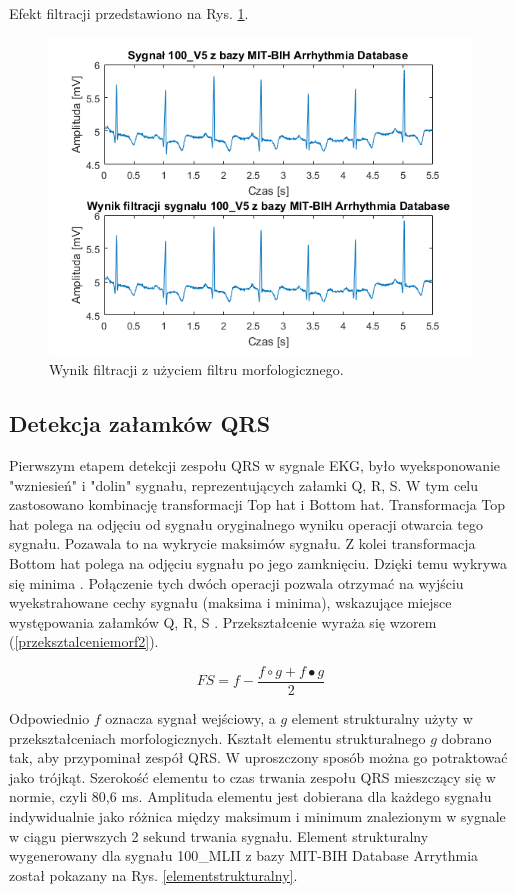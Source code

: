 \documentclass[10pt,a4paper]{article}
\begin{document}
Efekt filtracji przedstawiono na Rys. \ref{filtracja}.


\begin{figure}[h]
	\centerline{\includegraphics[scale=0.85]{filtracja}}
	\caption{ Wynik filtracji z użyciem filtru morfologicznego.}
	\label{filtracja}
\end{figure}
\FloatBarrier


\subsection{Detekcja załamków QRS}

Pierwszym etapem detekcji zespołu QRS w sygnale EKG, było wyeksponowanie "wzniesień" i "dolin" sygnału, reprezentujących załamki Q, R, S. W tym celu zastosowano kombinację transformacji Top hat i Bottom hat. Transformacja Top hat polega na odjęciu od sygnału oryginalnego wyniku operacji otwarcia tego sygnału. Pozawala to na wykrycie maksimów sygnału. Z kolei transformacja Bottom hat polega na odjęciu sygnału po jego zamknięciu. Dzięki temu wykrywa się minima \cite{MMdetection}. Połączenie tych dwóch operacji pozwala otrzymać na wyjściu wyekstrahowane cechy sygnału (maksima i minima), wskazujące miejsce występowania załamków Q, R, S \cite{adaptiveMM}. Przekształcenie wyraża się wzorem (\ref{przeksztalceniemorf2}).

\begin{equation}
\ FS = f - \frac{f \circ g + f \bullet g}{2}\ 
\label{przeksztalceniemorf2}
\end{equation}

Odpowiednio $f$ oznacza sygnał wejściowy, a $g$ element strukturalny użyty w przekształceniach morfologicznych. Kształt elementu strukturalnego $g$ dobrano tak, aby przypominał zespół QRS. W uproszczony sposób można go potraktować jako trójkąt. Szerokość elementu to czas trwania zespołu QRS mieszczący się w normie, czyli 80,6 ms. Amplituda elementu jest dobierana dla każdego sygnału indywidualnie jako różnica między maksimum i minimum znalezionym w sygnale w ciągu pierwszych 2 sekund trwania sygnału. Element strukturalny wygenerowany dla sygnału 100\_MLII z bazy MIT-BIH Database Arrythmia został pokazany na Rys. \ref{elementstrukturalny}.
\end{document}
